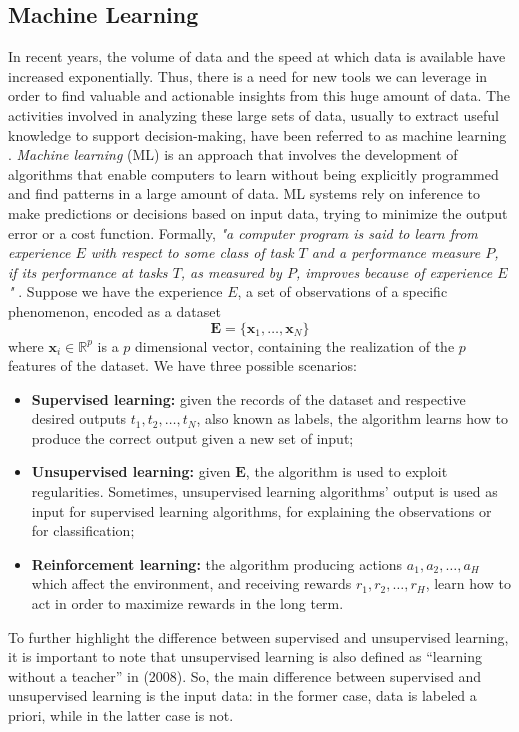 \subsection{Machine Learning}
\label{subsec:ml}
In recent years, the volume of data and the speed at which data is available have increased exponentially. Thus, there is a need for new tools we can leverage in order to find valuable and actionable insights from this huge amount of data. The activities involved in analyzing these large sets of data, usually to extract useful knowledge to support decision-making, have been referred to as machine learning \cite{vercellis_business_2009}. \emph{Machine learning} (ML) is an approach that involves the development of algorithms that enable computers to learn without being explicitly programmed and find patterns in a large amount of data. ML systems rely on inference to make predictions or decisions based on input data, trying to minimize the output error or a cost function. Formally, \emph{"a computer program is said to learn from experience $E$ with respect to some class of task $T$ and a performance measure $P$, if its performance at tasks $T$, as measured by $P$, improves because of experience $E$"} \cite{zaki_data_2020, pierluca_lanzi_data_2021}. Suppose we have the experience $E$, a set of observations of a specific phenomenon, encoded as a dataset
\begin{equation}
    \label{eq:dataset}
    \mathbf{E}=\{\mathbf{x}_1, \dots, \mathbf{x}_N\} 
\end{equation}
where $\mathbf{x}_i\in \mathbb{R}^p$ is a $p$ dimensional vector, containing the realization of the $p$ features of the dataset. We have three possible scenarios:
\begin{itemize}
    \item \textbf{Supervised learning:} given the records of the dataset and respective desired outputs $t_1, t_2, \dots, t_N$, also known as labels, the algorithm learns how to produce the correct output given a new set of input;
    \item \textbf{Unsupervised learning:} given $\mathbf{E}$, the algorithm is used to exploit regularities. Sometimes, unsupervised learning algorithms' output is used as input for supervised learning algorithms, for explaining the observations or for classification;
    \item \textbf{Reinforcement learning:} the algorithm producing actions $a_1, a_2, \dots, a_H$ which affect the environment, and receiving rewards $r_1, r_2, \dots, r_H$, learn how to act in order to maximize rewards in the long term.
\end{itemize}
To further highlight the difference between supervised and unsupervised learning, it is important to note that unsupervised learning is also defined as “learning without a teacher” in \citeauthor{tibshirani_elements_2008} (2008). So, the main difference between supervised and unsupervised learning is the input data: in the former case, data is labeled a priori, while in the latter case is not. 

